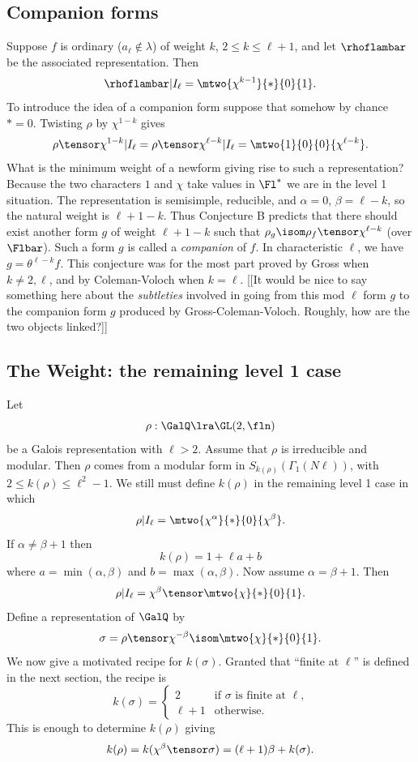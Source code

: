 \documentclass{report}
\begin{document}
\subsection{Companion forms}
Suppose $f$ is ordinary ($a_{\ell}\not\in\lambda$) of weight $k$,
$2\leq k\leq \ell+1$, and let $\rhoflambar$ be
the associated representation.
Then
  $$\rhoflambar|I_\ell =\mtwo{\chi^{k-1}}{*}{0}{1}.$$
To introduce the idea of a companion form suppose that somehow
by chance $*=0$.  Twisting $\rho$ by $\chi^{1-k}$ gives
$$\rho\tensor\chi^{1-k}|I_\ell=\rho\tensor\chi^{\ell-k}|I_\ell=
  \mtwo{1}{0}{0}{\chi^{\ell-k}}.$$
What is the minimum weight of a newform giving rise to
such a representation?
Because the two characters $1$ and $\chi$ take values in $\Fl^*$ we
are in the level 1 situation. The representation is semisimple,
reducible, and $\alpha=0$, $\beta=\ell-k$, so the natural weight is
$\ell+1-k$. Thus Conjecture B predicts that there should exist another
form $g$ of weight $\ell+1-k$ such that
$\rho_g\isom \rho_f\tensor\chi^{\ell-k}$ (over $\Flbar$).
Such a form $g$ is called a {\em companion} of $f$.
In characteristic $\ell$, we have $g=\theta^{\ell-k}f$.
This conjecture was for the most part proved by Gross \cite{gross:tameness}
when $k\neq 2,\ell$,  and by Coleman-Voloch \cite{coleman-voloch}
when $k=\ell$.
[[It would be nice to say something here about the {\em subtleties}
  involved in going from this mod $\ell$ form $g$ to the
  companion form $g$ produced by Gross-Coleman-Voloch.  Roughly,
  how are the two objects linked?]]

\subsection{The Weight: the remaining level 1 case}
Let
  $$\rho:\GalQ\lra\GL(2,\fln)$$
be a Galois representation with $\ell>2$.
Assume that $\rho$ is irreducible and modular.
Then $\rho$ comes from a modular form in
$S_{k(\rho)}(\Gamma_1(N\ell))$,
with $2\leq k(\rho)\leq \ell^2-1$.
We still must define $k(\rho)$ in the remaining level 1 case
in which
$$\rho|I_{\ell}=\mtwo{\chi^{\alpha}}{*}{0}{\chi^{\beta}}.$$
If $\alpha\neq\beta+1$ then
$$k(\rho) = 1+\ell a+b$$ where
$a=\min(\alpha,\beta)$ and $b=\max(\alpha,\beta)$.
Now assume $\alpha=\beta+1$.
Then
$$\rho|I_{\ell}
     =\chi^{\beta}\tensor\mtwo{\chi}{*}{0}{1}.$$
Define a representation of $\GalQ$ by
$$\sigma=\rho\tensor\chi^{-\beta}\isom
  \mtwo{\chi}{*}{0}{1}.$$
We now give a motivated recipe for $k(\sigma)$.
Granted that ``finite at $\ell$'' is defined in the next section, the recipe is
$$k(\sigma)=\begin{cases}2  &\text{if $\sigma$ is finite at $\ell$,}\\
                    \ell+1  &\text{otherwise}.\end{cases}$$
This is enough to determine $k(\rho)$ giving
$$k(\rho)=k(\chi^{\beta}\tensor\sigma)=(\ell+1)\beta+k(\sigma).$$
\end{document}
